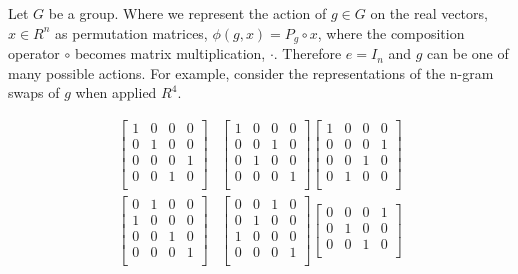 Let $G$ be a group. Where we represent the action of $g\in G$ on the real vectors, $x\in R^n$
as permutation matrices, $\phi(g, x) = P_g \circ x$, where the composition operator $\circ$ becomes matrix multiplication, $\cdot$. Therefore $e = I_n$ and $g$ can be one of many possible actions. For example, consider the representations of the n-gram swaps \footnotemark of $g$ when applied $R^4$.


\begin{align*}
 \begin{bmatrix}
 1 & 0 & 0 & 0 \\
 0 & 1 & 0 & 0 \\
 0 & 0 & 0 & 1 \\
 0 & 0 & 1 & 0 \\
 \end{bmatrix}
 &\begin{bmatrix}
 1 & 0 & 0 & 0 \\
 0 & 0 & 1 & 0 \\
 0 & 1 & 0 & 0 \\
 0 & 0 & 0 & 1 \\
 \end{bmatrix}
 \begin{bmatrix}
 1 & 0 & 0 & 0 \\
 0 & 0 & 0 & 1 \\
 0 & 0 & 1 & 0 \\
 0 & 1 & 0 & 0 \\
 \end{bmatrix}   \\
 \begin{bmatrix}
 0 & 1 & 0 & 0 \\
 1 & 0 & 0 & 0 \\
 0 & 0 & 1 & 0 \\
 0 & 0 & 0 & 1 \\
 \end{bmatrix}
 &\begin{bmatrix}
 0 & 0 & 1 & 0 \\
 0 & 1 & 0 & 0 \\
 1 & 0 & 0 & 0 \\
 0 & 0 & 0 & 1 \\
 \end{bmatrix}
 \begin{bmatrix}
 0 & 0 & 0 & 1 \\
 0 & 1 & 0 & 0 \\
 0 & 0 & 1 & 0 \\

\end{bmatrix}
\end{align*}

